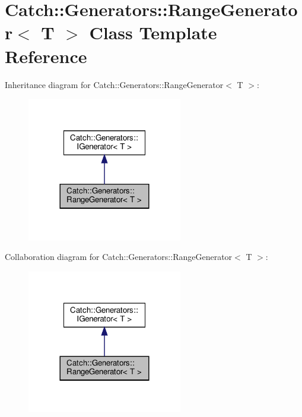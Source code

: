 \hypertarget{classCatch_1_1Generators_1_1RangeGenerator}{}\section{Catch\+::Generators\+::Range\+Generator$<$ T $>$ Class Template Reference}
\label{classCatch_1_1Generators_1_1RangeGenerator}


Inheritance diagram for Catch\+::Generators\+::Range\+Generator$<$ T $>$\+:
\nopagebreak
\begin{figure}[H]
\begin{center}
\leavevmode
\includegraphics[width=192pt]{classCatch_1_1Generators_1_1RangeGenerator__inherit__graph}
\end{center}
\end{figure}


Collaboration diagram for Catch\+::Generators\+::Range\+Generator$<$ T $>$\+:
\nopagebreak
\begin{figure}[H]
\begin{center}
\leavevmode
\includegraphics[width=192pt]{classCatch_1_1Generators_1_1RangeGenerator__coll__graph}
\end{center}
\end{figure}
